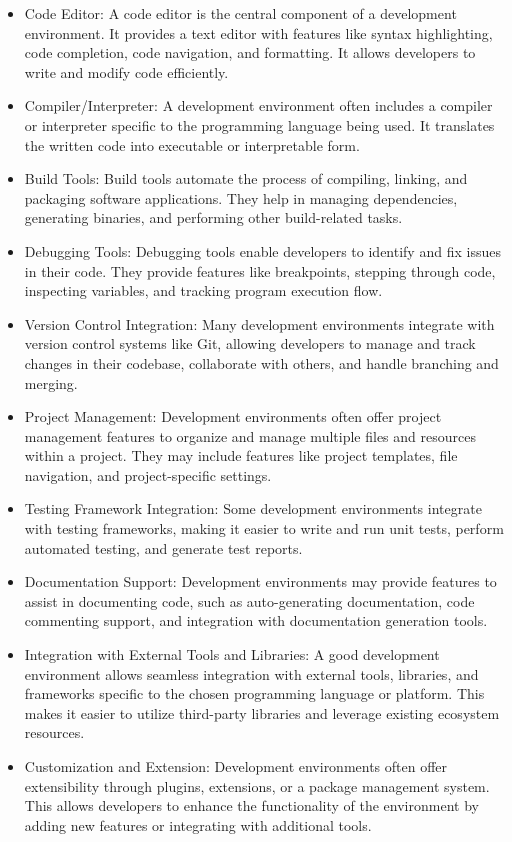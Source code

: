 \begin{itemize}
  \item Code Editor: A code editor is the central component of a development environment. It provides a text editor with features like syntax highlighting, code completion, code navigation, and formatting. It allows developers to write and modify code efficiently.
  \item Compiler/Interpreter: A development environment often includes a compiler or interpreter specific to the programming language being used. It translates the written code into executable or interpretable form.
  \item Build Tools: Build tools automate the process of compiling, linking, and packaging software applications. They help in managing dependencies, generating binaries, and performing other build-related tasks.
  \item Debugging Tools: Debugging tools enable developers to identify and fix issues in their code. They provide features like breakpoints, stepping through code, inspecting variables, and tracking program execution flow.
  \item Version Control Integration: Many development environments integrate with version control systems like Git, allowing developers to manage and track changes in their codebase, collaborate with others, and handle branching and merging.
  \item Project Management: Development environments often offer project management features to organize and manage multiple files and resources within a project. They may include features like project templates, file navigation, and project-specific settings.
  \item Testing Framework Integration: Some development environments integrate with testing frameworks, making it easier to write and run unit tests, perform automated testing, and generate test reports.
  \item Documentation Support: Development environments may provide features to assist in documenting code, such as auto-generating documentation, code commenting support, and integration with documentation generation tools.
  \item Integration with External Tools and Libraries: A good development environment allows seamless integration with external tools, libraries, and frameworks specific to the chosen programming language or platform. This makes it easier to utilize third-party libraries and leverage existing ecosystem resources.
  \item Customization and Extension: Development environments often offer extensibility through plugins, extensions, or a package management system. This allows developers to enhance the functionality of the environment by adding new features or integrating with additional tools.
\end{itemize}
